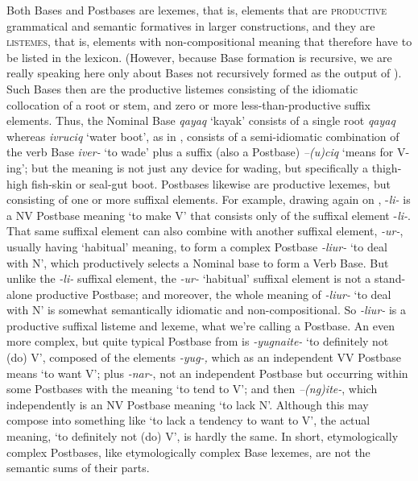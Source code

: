 \documentclass[output=paper]{langscibook}
\begin{document}
Both Bases and Postbases are lexemes, that is, elements that are \textsc{productive} grammatical and semantic formatives in larger constructions, and they are \textsc{listemes,} that is, elements with non-compositional meaning that therefore have to be listed in the lexicon. (However, because Base formation  is recursive, we are really speaking here only about Bases not recursively formed as the output of ). Such Bases then are the productive listemes consisting of the idiomatic collocation of a root or stem, and zero or more less-than-productive suffix elements. Thus, the Nominal Base \textit{qayaq} `kayak' consists of a single root \textit{qayaq} whereas \textit{ivruciq} `water boot', as in , consists of a semi-idiomatic combination of the verb Base \textit{iver-} `to wade' plus a suffix (also a Postbase) \textit{–(u)ciq} `means for V-ing'; but the meaning is not just any device for wading, but specifically a thigh-high fish-skin or seal-gut boot. Postbases likewise are productive lexemes, but consisting of one or more suffixal elements. For example, drawing again on , -\textit{li-} is a NV Postbase meaning `to make V' that consists only of the suffixal element -\textit{li-}. That same suffixal element can also combine with another suffixal element, \textit{-ur-}, usually having `habitual' meaning, to form a complex Postbase \textit{-liur-} `to deal with N', which productively selects a Nominal base to form a Verb Base. But unlike the \textit{-li-} suffixal element, the \textit{-ur-} `habitual' suffixal element is not a stand-alone productive Postbase; and moreover, the whole meaning of \textit{-liur-} `to deal with N' is somewhat semantically idiomatic and non-compositional. So \textit{{}-liur-} is a productive suffixal listeme and lexeme, what we're calling a Postbase. An even more complex, but quite typical Postbase from  is \textit{{}-yugnaite-} `to definitely not (do) V', composed of the elements \textit{{}-yug-,} which as an independent VV Postbase means `to want V'; plus \textit{{}-nar-}, not an independent Postbase but occurring within some Postbases with the meaning `to tend to V'; and then \textit{–(ng)ite-}, which independently is an NV Postbase meaning `to lack N'. Although this may compose into something like `to lack a tendency to want to V', the actual meaning, `to definitely not (do) V', is hardly the same. In short, etymologically complex Postbases, like etymologically complex Base lexemes, are not the semantic sums of their parts.
\end{document}
